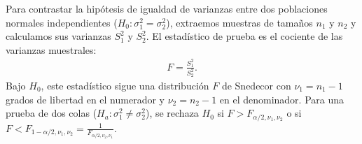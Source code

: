 \begin{teorema}
	Para contrastar la hipótesis de igualdad de varianzas entre dos poblaciones normales independientes ($H_0: \sigma_1^2 = \sigma_2^2$), extraemos muestras de tamaños $n_1$ y $n_2$ y calculamos sus varianzas $S_1^2$ y $S_2^2$. El estadístico de prueba es el cociente de las varianzas muestrales:
	\begin{align}
		F = \frac{S_1^2}{S_2^2}.
	\end{align}
	Bajo $H_0$, este estadístico sigue una distribución $F$ de Snedecor con $\nu_1 = n_1 - 1$ grados de libertad en el numerador y $\nu_2 = n_2 - 1$ en el denominador.
	Para una prueba de dos colas ($H_a: \sigma_1^2 \neq \sigma_2^2$), se rechaza $H_0$ si $F > F_{\alpha/2, \nu_1, \nu_2}$ o si $F < F_{1-\alpha/2, \nu_1, \nu_2} = \frac{1}{F_{\alpha/2, \nu_2, \nu_1}}$.
\end{teorema}

